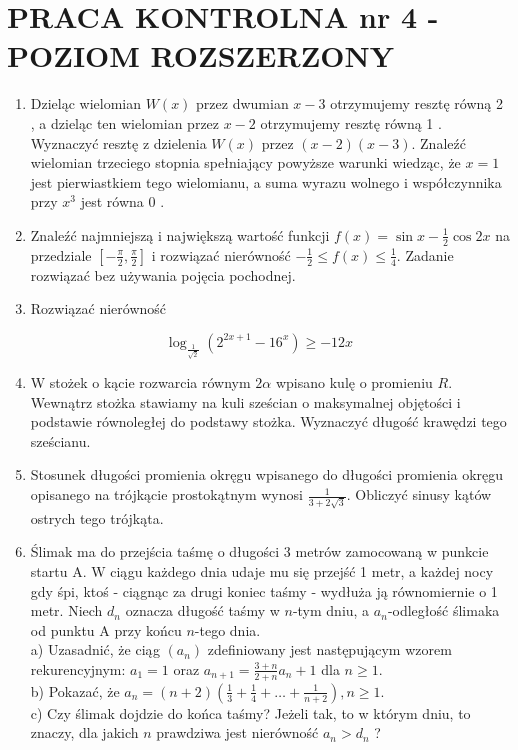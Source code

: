 \documentclass[10pt]{article}
\begin{document}
\section*{PRACA KONTROLNA nr 4 - POZIOM ROZSZERZONY}
\begin{enumerate}
  \item Dzieląc wielomian $W(x)$ przez dwumian $x-3$ otrzymujemy resztę równą 2 , a dzieląc ten wielomian przez $x-2$ otrzymujemy resztę równą 1 . Wyznaczyć resztę z dzielenia $W(x)$ przez $(x-2)(x-3)$. Znaleźć wielomian trzeciego stopnia spełniający powyższe warunki wiedząc, że $x=1$ jest pierwiastkiem tego wielomianu, a suma wyrazu wolnego i współczynnika przy $x^{3}$ jest równa 0 .
  \item Znaleźć najmniejszą i największą wartość funkcji $f(x)=\sin x-\frac{1}{2} \cos 2 x$ na przedziale $\left[-\frac{\pi}{2}, \frac{\pi}{2}\right]$ i rozwiązać nierówność $-\frac{1}{2} \leqslant f(x) \leqslant \frac{1}{4}$. Zadanie rozwiązać bez używania pojęcia pochodnej.
  \item Rozwiązać nierówność
\end{enumerate}

$$
\log _{\frac{1}{\sqrt{2}}}\left(2^{2 x+1}-16^{x}\right) \geqslant-12 x
$$

\begin{enumerate}
  \setcounter{enumi}{3}
  \item W stożek o kącie rozwarcia równym $2 \alpha$ wpisano kulę o promieniu $R$. Wewnątrz stożka stawiamy na kuli sześcian o maksymalnej objętości i podstawie równoległej do podstawy stożka. Wyznaczyć długość krawędzi tego sześcianu.
  \item Stosunek długości promienia okręgu wpisanego do długości promienia okręgu opisanego na trójkącie prostokątnym wynosi $\frac{1}{3+2 \sqrt{3}}$. Obliczyć sinusy kątów ostrych tego trójkąta.
  \item Ślimak ma do przejścia taśmę o długości 3 metrów zamocowaną w punkcie startu A. W ciągu każdego dnia udaje mu się przejść 1 metr, a każdej nocy gdy śpi, ktoś - ciągnąc za drugi koniec taśmy - wydłuża ją równomiernie o 1 metr. Niech $d_{n}$ oznacza długość taśmy w $n$-tym dniu, a $a_{n}$-odległość ślimaka od punktu A przy końcu $n$-tego dnia.\\
a) Uzasadnić, że ciąg $\left(a_{n}\right)$ zdefiniowany jest następującym wzorem rekurencyjnym: $a_{1}=1$ oraz $a_{n+1}=\frac{3+n}{2+n} a_{n}+1$ dla $n \geqslant 1$.\\
b) Pokazać, że $a_{n}=(n+2)\left(\frac{1}{3}+\frac{1}{4}+\ldots+\frac{1}{n+2}\right), n \geqslant 1$.\\
c) Czy ślimak dojdzie do końca taśmy? Jeżeli tak, to w którym dniu, to znaczy, dla jakich $n$ prawdziwa jest nierówność $a_{n}>d_{n}$ ?
\end{enumerate}
\end{document}
